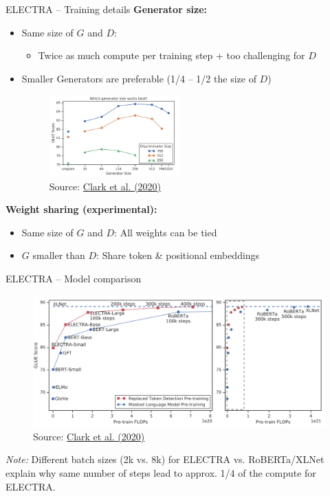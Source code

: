 \documentclass[]{beamer}
\begin{document}
\begin{frame}{ELECTRA -- Training details}
\small
	\textbf{Generator size:}

	\begin{itemize}
		\item Same size of $G$ and $D$: 
			\begin{itemize}
				\item Twice as much compute per training step + too challenging for $D$
			\end{itemize}
		\item Smaller Generators are preferable (1/4 -- 1/2 the size of $D$)
	\begin{figure}
		\centering
		\includegraphics[width = 5cm]{figure/electra-size-g.png}\\ 
		\scriptsize{Source:} \href{https://arxiv.org/pdf/2003.10555.pdf}{\scriptsize Clark et al. (2020)}
	\end{figure}
	\end{itemize}
	
	\textbf{Weight sharing (experimental):}

	\begin{itemize}
		\item Same size of $G$ and $D$: All weights can be tied
		\item $G$ smaller than $D$: Share token \& positional embeddings 
	\end{itemize}
\end{frame}



\begin{frame}{ELECTRA -- Model comparison}
	
	\begin{figure}
		\centering
		\includegraphics[width = 12cm]{figure/electra-glue.png}\\ 
		\footnotesize{Source:} \href{https://arxiv.org/pdf/2003.10555.pdf}{\footnotesize Clark et al. (2020)}
	\end{figure}
	
{\footnotesize \textit{Note:} Different batch sizes (2k vs. 8k) for ELECTRA vs. RoBERTa/XLNet explain why same number of steps lead to approx. 1/4 of the compute for ELECTRA.}
\end{frame}
\end{document}
